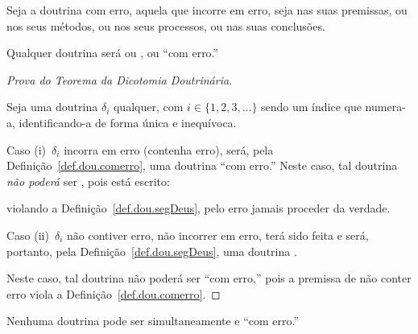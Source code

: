     \begin{DEF}
        \label{def.dou.comerro}
        Seja a doutrina com erro, aquela que incorre em erro, seja nas suas premissas, ou nos seus métodos,  ou  nos
        seus processos, ou nas suas conclusões.
    \end{DEF}

    \begin{THE}
        \label{the.dou.dicotomia}
        Qualquer doutrina será ou , ou ``com erro.''
    \end{THE}

    \begin{proof}[Prova do Teorema da Dicotomia Doutrinária]
        \label{pro.the.dicotomia}

        Seja uma doutrina $\delta_i$\linebreak{} qual\-quer, com $i \in \{1, 2, 3, \ldots\}$  sendo  um  índice  que
        numera-a, i\-den\-ti\-fi\-can\-do-a de forma única e inequívoca.

        Caso (i)~$\delta_i$ incorra  em  erro  (contenha  erro),  será,  pela  Definição~\ref{def.dou.comerro},  uma
        doutrina ``com erro.'' Neste caso, tal doutrina \emph{não  poderá}  ser  ,  pois  está
        escrito:


        \noindent violando a Definição~\ref{def.dou.segDeus}, pelo erro jamais proceder da verdade.

        Caso (ii)~$\delta_i$ não contiver erro, não incorrer em erro, terá sido feita     e     será,     portanto,     pela
        Definição~\ref{def.dou.segDeus}, uma doutrina .

        Neste caso, tal doutrina não poderá  ser  ``com  erro,''  pois  a  premissa  de  não  conter  erro  viola  a
        Definição~\ref{def.dou.comerro}.

    \end{proof}

    \begin{COR}
        \label{cor.dicotomia.1}
        Nenhuma doutrina pode ser simultaneamente  e ``com erro.''
    \end{COR}

